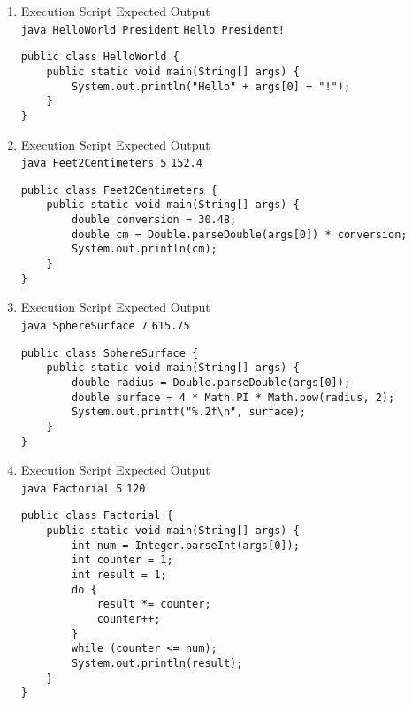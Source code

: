 \begin{enumerate}[label=\textbf{(\alph*)}]
\item Execution Script \hfill Expected Output\\
\texttt{java HelloWorld President} \hfill \texttt{Hello President!}

\lstset{language=Java,tabsize=4}
\begin{lstlisting}
public class HelloWorld {
	public static void main(String[] args) {
		System.out.println("Hello" + args[0] + "!");
	}
}
\end{lstlisting}

\item Execution Script \hfill Expected Output\\
\texttt{java Feet2Centimeters 5} \hfill \texttt{152.4}

\lstset{language=Java,tabsize=4}
\begin{lstlisting}
public class Feet2Centimeters {
	public static void main(String[] args) {
		double conversion = 30.48;
		double cm = Double.parseDouble(args[0]) * conversion;
		System.out.println(cm);
	}
}
\end{lstlisting}

\item Execution Script \hfill Expected Output\\
\texttt{java SphereSurface 7} \hfill \texttt{615.75}

\lstset{language=Java,tabsize=4}
\begin{lstlisting}
public class SphereSurface {
	public static void main(String[] args) {
		double radius = Double.parseDouble(args[0]);
		double surface = 4 * Math.PI * Math.pow(radius, 2);
		System.out.printf("%.2f\n", surface);
	}
}
\end{lstlisting}

\item Execution Script \hfill Expected Output\\
\texttt{java Factorial 5} \hfill \texttt{120}

\lstset{language=Java,tabsize=4}
\begin{lstlisting}
public class Factorial {
	public static void main(String[] args) {
		int num = Integer.parseInt(args[0]);
		int counter = 1;
		int result = 1;
		do {
			result *= counter;
			counter++;
		}
		while (counter <= num);
		System.out.println(result);
	}
}
\end{lstlisting}

\end{enumerate}

